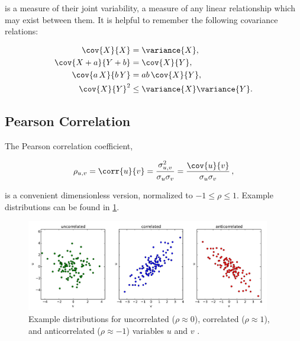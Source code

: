 \noindent is a measure of their joint variability,
\ie a measure of any linear relationship which may exist between them.
It is helpful to remember the following covariance relations:

\begin{subequations}\label{eq:stats:covar_relations}
\begin{align}
\cov{X}{X} &= \variance{X}, \label{eq:stats:covar_relations:var} \\
\cov{X + a}{Y + b} &= \cov{X}{Y}, \label{eq:stats:covar_relations:add} \\
\cov{a\,X}{b\,Y} &= ab\,\cov{X}{Y}, \label{eq:stats:covar_relations:mult} \\
\cov{X}{Y}^{2} &\leq \variance{X}\variance{Y}. \label{eq:stats:covar_relations:inequality}
\end{align}
\end{subequations}

\subsection{Pearson Correlation}
\label{stats:corr_covar:pearson}

The Pearson correlation coefficient,

\begin{equation}\label{eq:stats:corr}
\rho_{u,v} = \corr{u}{v} = \frac{\sigma_{u,v}^{2}}{\sigma_{u}\sigma_{v}} = \frac{\cov{u}{v}}{\sigma_{u}\sigma_{v}}\,,
\end{equation}

\noindent is a convenient dimensionless version, normalized to $-1 \leq \rho \leq 1$.
Example distributions can be found in \cref{fig:stats:corr_ex}.

\begin{figure}
\centering
\includegraphics[width=0.95\textwidth]{figures/stats/corr_ex}
\caption{
Example distributions for
uncorrelated ($\rho \approx 0$),
correlated ($\rho \approx 1$),
and anticorrelated ($\rho \approx -1$)
variables $u$ and $v$ \cite{DougNotes}.
}
\label{fig:stats:corr_ex}
\end{figure}

